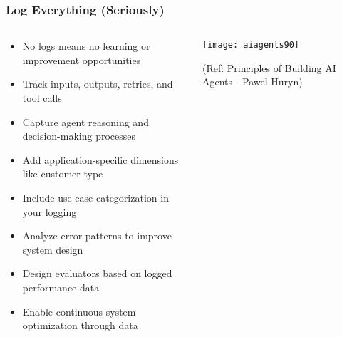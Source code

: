 \begin{frame}[fragile]\frametitle{Log Everything (Seriously)}
\begin{columns}
    \begin{column}[T]{0.6\linewidth}
      \begin{itemize}
		\item No logs means no learning or improvement opportunities
		\item Track inputs, outputs, retries, and tool calls
		\item Capture agent reasoning and decision-making processes
		\item Add application-specific dimensions like customer type
		\item Include use case categorization in your logging
		\item Analyze error patterns to improve system design
		\item Design evaluators based on logged performance data
		\item Enable continuous system optimization through data
	  \end{itemize}
    \end{column}
    \begin{column}[T]{0.4\linewidth}
		\begin{center}
		\texttt{[image: aiagents90]}
		
		{\tiny (Ref: Principles of Building AI Agents - Pawel Huryn)}
		\end{center}	
    \end{column}
  \end{columns}
\end{frame}